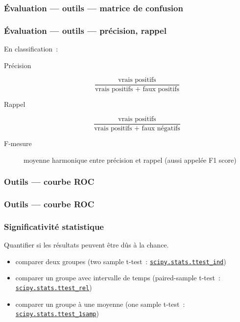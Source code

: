 \documentclass{formation}
\begin{document}
\begin{frame}
  \frametitle{Évaluation — outils — matrice de confusion}

\end{frame}

\begin{frame}
  \frametitle{Évaluation — outils — précision, rappel}

  En classification :

  \begin{description}
  \item[Précision]
    \[
    \frac{\text{vrais positifs}}{\text{vrais positifs + faux positifs}}
    \]
  \item[Rappel]
    \[
    \frac{\text{vrais positifs}}{\text{vrais positifs + faux négatifs}}
  \]
  \item[F-mesure] moyenne harmonique entre précision et rappel (aussi
    appelée F1 score)
  \end{description}
\end{frame}

\begin{frame}
  \frametitle{Outils — courbe ROC}

\end{frame}

\begin{frame}
  \frametitle{Outils — courbe ROC}

\end{frame}

\begin{frame}
  \frametitle{Significativité statistique}

  Quantifier si les résultats peuvent être dûs à la chance.

  \begin{itemize}
  \item comparer deux groupes (two sample t-test :
    \href{https://docs.scipy.org/doc/scipy/reference/generated/scipy.stats.ttest_ind.html}%
    {\texttt{scipy.stats.ttest\_ind}})
  \item comparer un groupe avec intervalle de temps (paired-sample
    t-test :
    \href{https://docs.scipy.org/doc/scipy/reference/generated/scipy.stats.ttest_rel.html}%
    {\texttt{scipy.stats.ttest\_rel}})
  \item comparer un groupe à une moyenne (one sample t-test :
    \href{https://docs.scipy.org/doc/scipy/reference/generated/scipy.stats.ttest_1samp.html}%
    {\texttt{scipy.stats.ttest\_1samp}})
  \end{itemize}
\end{frame}
\end{document}
